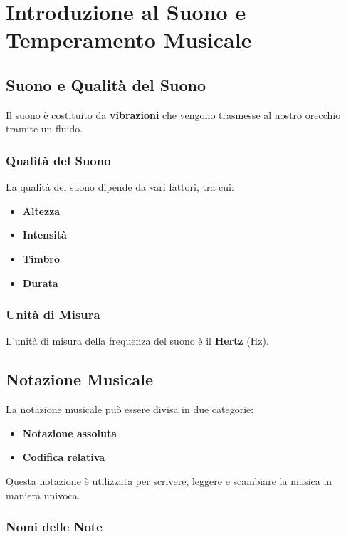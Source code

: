 
\chapter{Introduzione al Suono e Temperamento Musicale}
\section{Suono e Qualità del Suono}

Il suono è costituito da \textbf{vibrazioni} che vengono trasmesse al nostro orecchio tramite un fluido.

\subsection*{Qualità del Suono}

La qualità del suono dipende da vari fattori, tra cui:

\begin{itemize}
    \item \textbf{Altezza}
    \item \textbf{Intensità}
    \item \textbf{Timbro}
    \item \textbf{Durata}
\end{itemize}

\subsection*{Unità di Misura}

L'unità di misura della frequenza del suono è il \textbf{Hertz} (Hz).

\section{Notazione Musicale}

La notazione musicale può essere divisa in due categorie:

\begin{itemize}
    \item \textbf{Notazione assoluta}
    \item \textbf{Codifica relativa}
\end{itemize}

Questa notazione è utilizzata per scrivere, leggere e scambiare la musica in maniera univoca.

\subsection*{Nomi delle Note}

